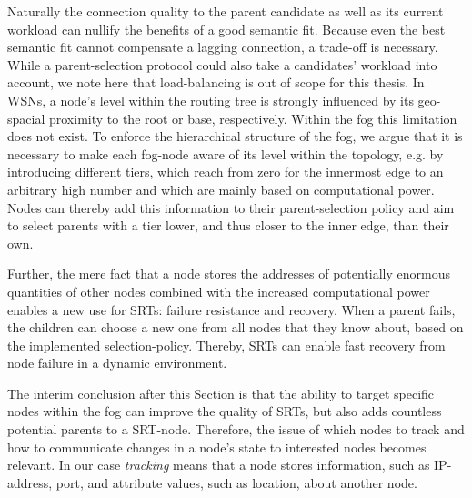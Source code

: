   Naturally the connection quality to the parent candidate as well as its current workload can nullify the benefits of a good semantic fit. Because even the best semantic fit cannot compensate a lagging connection, a trade-off is necessary. While a parent-selection protocol could also take a candidates' workload into account, we note here that load-balancing is out of scope for this thesis. In WSNs, a node's level within the routing tree is strongly influenced by its geo-spacial proximity to the root or base, respectively. Within the fog this limitation does not exist. To enforce the hierarchical structure of the fog, we argue that it is necessary to make each fog-node aware of its level within the topology, e.g. by introducing different tiers, which reach from zero for the innermost edge to an arbitrary high number and which are mainly based on computational power. Nodes can thereby add this information to their parent-selection policy and aim to select parents with a tier lower, and thus closer to the inner edge, than their own.

  Further, the mere fact that a node stores the addresses of potentially enormous quantities of other nodes combined with the increased computational power enables a new use for SRTs: failure resistance and recovery. When a parent fails, the children can choose a new one from all nodes that they know about, based on the implemented selection-policy. Thereby, SRTs can enable fast recovery from node failure in a dynamic environment.
  
  The interim conclusion after this Section is that the ability to target specific nodes within the fog can improve the quality of SRTs, but also adds countless potential parents to a SRT-node. Therefore, the issue of which nodes to track and how to communicate changes in a node's state to interested nodes becomes relevant. In our case \textit{tracking} means that a node stores information, such as IP-address, port, and attribute values, such as location, about another node.

